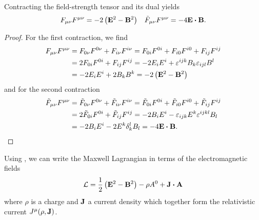 \begin{lemma}
	Contracting the field-strength tensor and its dual yields
		\begin{align}
		F_{\mu\nu}
		F^{\mu\nu}
		=
		-2
		\left(
			\vb{E}^2
			-
			\vb{B}^2
		\right)
		&&
		\tilde{F}_{\mu\nu}
		F^{\mu\nu}
		=
		-
		4
		\vb{E}
		\vdot
		\vb{B}
		.
	\end{align}
\end{lemma}
\begin{proof}
	For the first contraction, we find
	\begin{equation*}
		\begin{split}
			F_{\mu\nu}
			F^{\mu\nu}
			&=
			F_{0\nu}
			F^{0\nu}
			+
			F_{i\nu}
			F^{i\nu}
			=
			F_{0i}
			F^{0i}
			+
			F_{i0}
			F^{i0}
			+
			F_{ij}
			F^{ij}
			\\
			&=
			2
			F_{0i}
			F^{0i}
			+
			F_{ij}
			F^{ij}
			=
			-2
			E_i
			E^i
			+
			\varepsilon^{ijk}B_k
			\varepsilon_{ijl}B^l
			\\
			&=
			-
			2
			E_i
			E^i
			+
			2
			B_k
			B^k
			=
			-
			2
			\left(
				\vb{E}^2
				-
				\vb{B}^2
			\right)
		\end{split}
	\end{equation*}
	and for the second contraction
	\begin{equation*}
		\begin{split}
			\tilde{F}_{\mu\nu}
			F^{\mu\nu}
			&=
			\tilde{F}_{0\nu}
			F^{0\nu}
			+
			\tilde{F}_{i\nu}
			F^{i\nu}
			=
			\tilde{F}_{0i}
			F^{0i}
			+
			\tilde{F}_{i0}
			F^{i0}
			+
			\tilde{F}_{ij}
			F^{ij}
			\\
			&=
			2
			\tilde{F}_{0i}
			F^{0i}
			+
			\tilde{F}_{ij}
			F^{ij}
			=
			-
			2B_iE^i
			-
			\varepsilon_{ijk}E^k
			\varepsilon^{ijkl}B_l
			\\
			&=
			-
			2B_iE^i
			-
			2
			E^k
			\delta_k^l
			B_l
			=
			-
			4
			\vb{E}\vdot\vb{B}
			.
		\end{split}
	\end{equation*}
\end{proof}

\begin{corollary}
	Using , we can write the Maxwell Lagrangian in terms of the electromagnetic fields
	\begin{equation}
		\mathcal{L}
		=
		\frac{1}{2}
		\left(
			\vb{E}^2
			-
			\vb{B}^2
		\right)
		-
		\rho A^0
		+
		\vb{J}\vdot\vb{A}
	\end{equation}
	where $\rho$ is a charge and $\vb{J}$ a current density which together form the relativistic current $J^\mu(\rho,\vb{J})$.
\end{corollary}

